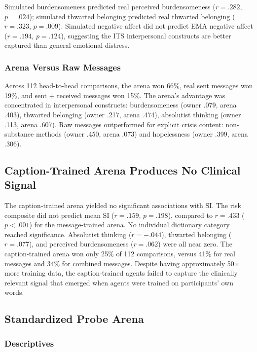 \documentclass[review,12pt,authoryear]{elsarticle}
\begin{document}
Simulated burdensomeness predicted real perceived burdensomeness ($r = .282$, $p = .024$); simulated thwarted belonging predicted real thwarted belonging ($r = .323$, $p = .009$). Simulated negative affect did not predict EMA negative affect ($r = .194$, $p = .124$), suggesting the ITS interpersonal constructs are better captured than general emotional distress.

\subsubsection{Arena Versus Raw Messages}

Across 112 head-to-head comparisons, the arena won 66\%, real sent messages won 19\%, and sent + received messages won 15\%. The arena's advantage was concentrated in interpersonal constructs: burdensomeness (owner .079, arena .403), thwarted belonging (owner .217, arena .474), absolutist thinking (owner .113, arena .607). Raw messages outperformed for explicit crisis content: non-substance methods (owner .450, arena .073) and hopelessness (owner .399, arena .306).

\subsection{Caption-Trained Arena Produces No Clinical Signal}

The caption-trained arena yielded no significant associations with SI. The risk composite did not predict mean SI ($r = .159$, $p = .198$), compared to $r = .433$ ($p < .001$) for the message-trained arena. No individual dictionary category reached significance. Absolutist thinking ($r = -.044$), thwarted belonging ($r = .077$), and perceived burdensomeness ($r = .062$) were all near zero. The caption-trained arena won only 25\% of 112 comparisons, versus 41\% for real messages and 34\% for combined messages. Despite having approximately 50$\times$ more training data, the caption-trained agents failed to capture the clinically relevant signal that emerged when agents were trained on participants' own words.

\subsection{Standardized Probe Arena}

\subsubsection{Descriptives}
\end{document}
